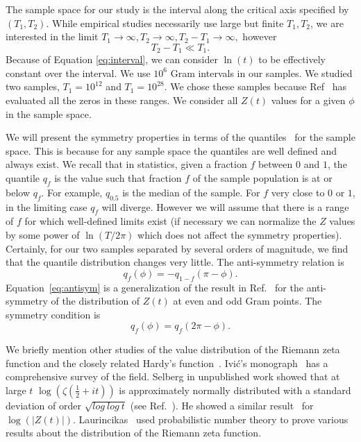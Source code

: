 \documentclass[twoside]{article}
\begin{document}
The sample space for our study is the interval along the critical axis specified by $(T_1, T_2)$. While empirical studies necessarily use large but finite  $T_1, T_2$, we are interested in the limit 
$T_1 \rightarrow \infty, T_2 \rightarrow \infty,  T_2-T_1 \rightarrow \infty,$ however
\begin{equation}
T_2 - T_1  \ll T_1. 
\label{eq:interval}
\end{equation}
Because of Equation \ref{eq:interval}, we can consider  $\ln (t)$  to be effectively constant over  the interval.
We use
$10^6$ Gram intervals in our samples. We studied  two samples, $T_1=10^{12}$ and  $T_1=10^{28}$. We chose these samples because  Ref~\cite{hiary 2010} has evaluated all the zeros in these ranges. We consider all $Z(t)$ values for a given $\phi$ in the sample space.

We will present the symmetry properties in terms of the quantiles~\cite{Feller 1971} for the sample space. This is because for any sample space the quantiles are well defined and always exist. We recall that in statistics, given a fraction $f$ between $0$ and $1$, the quantile $q_f$ is the value such that fraction $f$  of the sample population is at or below $q_f$. For example, $q_{0.5}$ is the median of the sample.
For $f$ very close to $0$ or $1$, in the limiting case $q_f$ will diverge. However we will assume that there is a range of $f$ for which well-defined limits exist (if necessary we can normalize the $Z$ values by some power of $\ln(T/2\pi)$ which does not affect the symmetry properties). Certainly, for our two samples separated by several orders of magnitude, we find that the quantile distribution changes very little. The anti-symmetry relation is
\begin{equation}
q_{f}(\phi) = -q_{1-f}(\pi-\phi).
\label{eq:antisym}
\end{equation}
Equation~\ref{eq:antisym}  is a generalization of the result in Ref.~\cite{Shanker 2018a} for the anti-symmetry of the distribution of $Z(t)$ at even and odd Gram points. The  symmetry condition is
\begin{equation}
q_{f}(\phi) = q_{f}(2\pi-\phi).
\label{eq:sym}
\end{equation}


We briefly mention other studies of the value distribution of the Riemann zeta function and the closely related Hardy's function~\cite{Hardy 1918}.  Ivi\'c's monograph~\cite{Ivic 2013} has a comprehensive survey of  the field.
Selberg in unpublished work showed that at large $t$ $\log (\zeta(\frac{1}{2} + it))$ is approximately normally distributed with a standard deviation of order $\sqrt{log~log~t}$ (see Ref.~\cite{Hejhal}). He showed a 
similar result~\cite{Selberg 1989, Selberg 1991} for $\log (|Z(t)|)$. Laurincikas~\cite{Laurincikas}  used probabilistic number theory to prove various results about the distribution of the Riemann zeta function.
\end{document}
